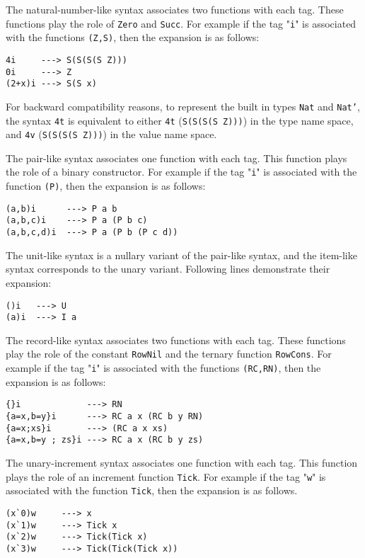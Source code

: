 \documentclass[11pt,twoside]{article}
\begin{document}
The natural-number-like syntax associates two functions with each
tag. These functions play the role of {\tt Zero} and {\tt Succ}.
For example if the tag "{\tt i}" is associated with
the functions {\tt (Z,S)}, then the expansion is as follows:
\begin{verbatim}
4i     ---> S(S(S(S Z)))
0i     ---> Z
(2+x)i ---> S(S x)
\end{verbatim}
For backward compatibility reasons, to represent the
built in types {\tt Nat} and {\tt Nat'}, the syntax \verb+4t+ is equivalent
to either \verb+4t+ ({\tt  S(S(S(S Z)))}) in the type name space, and \verb+4v+ 
({\tt  S(S(S(S Z)))}) in the value name space.


The pair-like syntax associates one function with each
tag. This function plays the role of a binary constructor.
For example if the tag "{\tt i}" is associated with
the function {\tt (P)}, then the expansion is as follows:
\begin{verbatim}
(a,b)i      ---> P a b
(a,b,c)i    ---> P a (P b c)
(a,b,c,d)i  ---> P a (P b (P c d))
\end{verbatim}
The unit-like syntax is a nullary variant of the pair-like syntax,
and the item-like syntax corresponds to the unary variant. Following
lines demonstrate their expansion:
\begin{verbatim}
()i   ---> U
(a)i  ---> I a
\end{verbatim}

The record-like syntax associates two functions with each
tag. These functions play the role of the constant {\tt RowNil} and 
the ternary function {\tt RowCons}.
For example if the tag "{\tt i}" is associated with
the functions {\tt (RC,RN)}, then the expansion is as follows:
\begin{verbatim}
{}i             ---> RN
{a=x,b=y}i      ---> RC a x (RC b y RN)
{a=x;xs}i       ---> (RC a x xs)
{a=x,b=y ; zs}i ---> RC a x (RC b y zs)
\end{verbatim}

The unary-increment syntax associates one function with each tag. This function
plays the role of an increment function {\tt Tick}. 
For example if the tag "{\tt w}" is associated with
the function {\tt Tick}, then the expansion is as follows.
\begin{verbatim}
(x`0)w     ---> x
(x`1)w     ---> Tick x
(x`2)w     ---> Tick(Tick x)
(x`3)w     ---> Tick(Tick(Tick x))
\end{verbatim}
\end{document}

